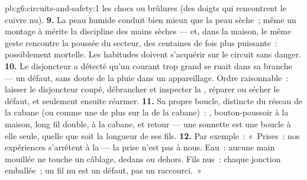 \begin{solution}{pb:g6:circuits-and-safety:1}
les chocs ou brûlures (des doigts qui rencontrent le cuivre nu).
\textbf{9.} La peau humide conduit bien mieux que la peau sèche~;
même un montage à  mérite la discipline des mains sèches --- et,
dans la maison, le même geste rencontre la poussée du secteur, des
centaines de fois plus puissante~: possiblement mortelle. Les
habitudes doivent s'acquérir sur le circuit sans danger.
\textbf{10.} Le disjoncteur a détecté qu'un courant trop grand se
ruait dans sa branche --- un défaut, sans doute de la pluie dans un
appareillage. Ordre raisonnable~: laisser le disjoncteur coupé,
débrancher et inspecter la , réparer ou sécher le défaut, et
seulement ensuite réarmer.
\textbf{11.} Sa propre boucle, distincte du réseau de la cabane (ou
comme une   de plus sur la  de la cabane)~:
, bouton-poussoir à la maison, long fil double,  à la
cabane, et retour --- une sonnette est une boucle  à elle
seule, quelle que soit la longueur de ses fils.
\textbf{12.} Par exemple~: «~Prises~: nos expériences s'arrêtent à la
 --- la prise n'est pas à nous. Eau~: aucune main mouillée ne
touche un câblage, dedans ou dehors. Fils nus~: chaque jonction
emballée~; un fil nu est un défaut, pas un raccourci.~»
\end{solution}
